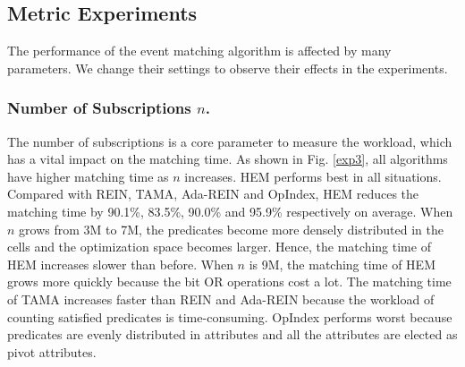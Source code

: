 \documentclass[runningheads]{llncs}
\begin{document}
\subsection{Metric Experiments}
The performance of the event matching algorithm is affected by many parameters. We change their settings to observe their effects in the experiments.


\subsubsection{Number of Subscriptions $n$.}
The number of subscriptions is a core parameter to measure the workload, which has a vital impact on the matching time. As shown in Fig. \ref{exp3}, all algorithms have higher matching time as $n$ increases. HEM performs best in all situations. Compared with REIN, TAMA, Ada-REIN and OpIndex, HEM reduces the matching time by 90.1\%, 83.5\%, 90.0\% and 95.9\% respectively on average. When $n$ grows from 3M to 7M, the predicates become more densely distributed in the cells and the optimization space becomes larger. Hence, the matching time of HEM increases slower than before. When $n$ is 9M, the matching time of HEM grows more quickly because the bit OR operations cost a lot. The matching time of TAMA increases faster than REIN and Ada-REIN because the workload of counting satisfied predicates is time-consuming. OpIndex performs worst because predicates are evenly distributed in attributes and all the attributes are elected as pivot attributes.
\end{document}
